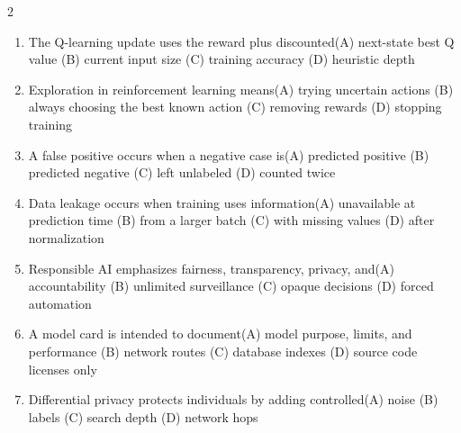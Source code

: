 \documentclass[a4paper]{article}
\begin{document}
\begin{multicols*}{2}
\begin{enumerate}[resume]
\item The Q-learning update uses the reward plus discounted\newline\hspace*{0.6em}(A) next-state best Q value \quad (B) current input size \newline\hspace*{0.6em}(C) training accuracy \quad (D) heuristic depth
\item Exploration in reinforcement learning means\newline\hspace*{0.6em}(A) trying uncertain actions \quad (B) always choosing the best known action \newline\hspace*{0.6em}(C) removing rewards \quad (D) stopping training
\item A false positive occurs when a negative case is\newline\hspace*{0.6em}(A) predicted positive \quad (B) predicted negative \newline\hspace*{0.6em}(C) left unlabeled \quad (D) counted twice
\item Data leakage occurs when training uses information\newline\hspace*{0.6em}(A) unavailable at prediction time \quad (B) from a larger batch \newline\hspace*{0.6em}(C) with missing values \quad (D) after normalization
\item Responsible AI emphasizes fairness, transparency, privacy, and\newline\hspace*{0.6em}(A) accountability \quad (B) unlimited surveillance \newline\hspace*{0.6em}(C) opaque decisions \quad (D) forced automation
\item A model card is intended to document\newline\hspace*{0.6em}(A) model purpose, limits, and performance \quad (B) network routes \newline\hspace*{0.6em}(C) database indexes \quad (D) source code licenses only
\item Differential privacy protects individuals by adding controlled\newline\hspace*{0.6em}(A) noise \quad (B) labels \newline\hspace*{0.6em}(C) search depth \quad (D) network hops

\end{enumerate}
\end{multicols*}
\end{document}
